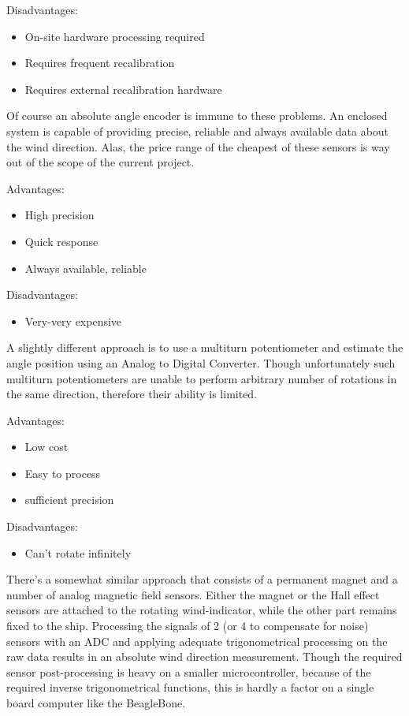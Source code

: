 Disadvantages:
\begin{itemize}
\item On-site hardware processing required
\item Requires frequent recalibration
\item Requires external recalibration hardware
\end{itemize}


Of course an absolute angle encoder is immune to these problems. An enclosed system is capable of providing precise, reliable and always available data about the wind direction. Alas, the price range of the cheapest of these sensors is way out of the scope of the current project.

Advantages:
\begin{itemize}
\item High precision
\item Quick response
\item Always available, reliable
\end{itemize}

Disadvantages:
\begin{itemize}
\item Very-very expensive
\end{itemize}


A slightly different approach is to use a multiturn potentiometer and estimate the angle position using an Analog to Digital Converter. Though unfortunately such multiturn potentiometers are unable to perform arbitrary number of rotations in the same direction, therefore their ability is limited.

Advantages:
\begin{itemize}
\item Low cost
\item Easy to process
\item sufficient precision
\end{itemize}

Disadvantages:
\begin{itemize}
\item Can't rotate infinitely
\end{itemize}


There's a somewhat similar approach that consists of a permanent magnet and a number of analog magnetic field sensors. Either the magnet or the Hall effect sensors are attached to the rotating wind-indicator, while the other part remains fixed to the ship. Processing the signals of 2 (or 4 to compensate for noise) sensors with an ADC and applying adequate trigonometrical processing on the raw data results in an absolute wind direction measurement. Though the required sensor post-processing is heavy on a smaller microcontroller, because of the required inverse trigonometrical functions, this is hardly a factor on a single board computer like the BeagleBone.

